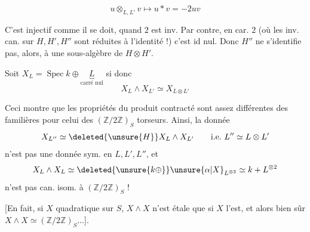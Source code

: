 \[
 u\mathbin{\otimes_{L,L'}}v\longmapsto u\ast v=-2uv
\]

C'est  injectif comme il se doit, quand $2$ est inv. Par contre, en car. $2$  (où les inv. can. sur  $H,H',H''$ sont réduites à l'identité !) c'est id nul. Donc $H''$ ne s'identifie pas, alors, à une sous-algèbre de $H\otimes H'$.

Soit $X_L=\operatorname{Spec} k\oplus\underbrace{L}_{\text{carré nul}}$ si
donc
\[
 X_L\wedge X_{L'}\simeq X_{L\otimes L'}
\]

Ceci montre que les propriétés du produit contracté sont assez différentes des   familières pour celui des $(\mathbb Z/2\mathbb Z)_S$ torseurs. Ainsi, la donnée
\[
 X_{L''}\simeq\deleted{\unsure{H}}X_L\wedge X_{L'}\qquad\text{i.e.}\ L''\simeq L\otimes L'
\]
n'est pas une donnée sym. en $L,L',L''$, et
\[
 X_L\wedge X_L\simeq\deleted{\unsure{k\oplus}}\unsure{\alpha|X}_{L^{\otimes2}}\simeq k+L^{\otimes2}
\]
n'est pas can. isom. à $(\mathbb Z/2\mathbb Z)_S$ !

[En fait, si $X$ quadratique sur $S$, $X\wedge X$ n'est étale que si $X$ l'est, et alors bien sûr $X\wedge X\simeq(\mathbb Z/2\mathbb Z)_S\ldots$].

